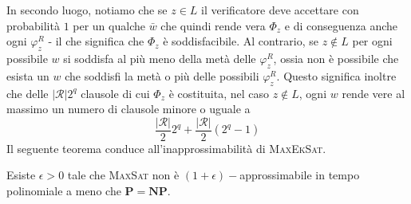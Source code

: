 In secondo luogo, notiamo che se $z \in L$ il verificatore deve accettare
con probabilità $1$ per un qualche $\bar{w}$ che quindi rende vera $\Phi_z$ e di conseguenza
anche ogni $\varphi_z^R$ - il che significa che $\Phi_z$ è soddisfacibile.
Al contrario, se $z \notin L$ per ogni possibile $w$ si soddisfa al più meno
della metà delle $\varphi_z^R$, ossia non è possibile che esista un $w$ che soddisfi
la metà o più delle possibili $\varphi_z^R$. Questo significa inoltre che delle
$|\mathcal{R}|2^q$ clausole di cui $\Phi_z$ è costituita, nel caso $z \notin L$,
ogni $w$ rende vere al massimo un numero di clausole minore o uguale a
$$
	\frac{|\mathcal{R}|}{2}2^q + \frac{|\mathcal{R}|}{2} (2^{q} - 1)
$$
\noindent
Il seguente teorema conduce all'inapprossimabilità di \textsc{MaxEkSat}.
\begin{theorem}
	Esiste $\epsilon > 0$ tale che \textsc{MaxSat} non è $(1+\epsilon)-$approssimabile in
	tempo polinomiale a meno che $\mathbf{P} = \mathbf{NP}$.
\end{theorem}
